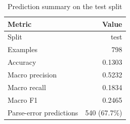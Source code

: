 \documentclass{article}
\begin{document}
\begin{table}[htbp]
  \centering
  \caption{Prediction summary on the test split}
  \label{tab:prediction_summary}
  \begin{tabular}{lr}
    \toprule
    \textbf{Metric} & \textbf{Value} \\
    \midrule
    Split & test \\
    Examples & 798 \\
    Accuracy & 0.1303 \\
    Macro precision & 0.5232 \\
    Macro recall & 0.1834 \\
    Macro F1 & 0.2465 \\
    Parse-error predictions & 540 (67.7\%) \\
    \bottomrule
  \end{tabular}
\end{table}
\end{document}
